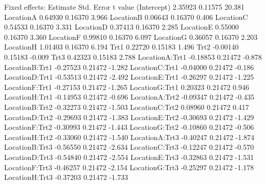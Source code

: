 \documentclass[12pt]{article}
\begin{document}
\begin{Schunk}
\begin{Soutput}
Fixed effects:
               Estimate Std. Error t value
(Intercept)     2.35923    0.11575  20.381
LocationA       0.64930    0.16370   3.966
LocationB       0.06643    0.16370   0.406
LocationC       0.54533    0.16370   3.331
LocationD       0.37413    0.16370   2.285
LocationE       0.55000    0.16370   3.360
LocationF       0.99810    0.16370   6.097
LocationG       0.36057    0.16370   2.203
LocationH       1.01403    0.16370   6.194
Trt1            0.22720    0.15183   1.496
Trt2           -0.00140    0.15183  -0.009
Trt3            0.42323    0.15183   2.788
LocationA:Trt1 -0.18853    0.21472  -0.878
LocationB:Trt1 -0.27523    0.21472  -1.282
LocationC:Trt1 -0.04000    0.21472  -0.186
LocationD:Trt1 -0.53513    0.21472  -2.492
LocationE:Trt1 -0.26297    0.21472  -1.225
LocationF:Trt1 -0.27153    0.21472  -1.265
LocationG:Trt1  0.20323    0.21472   0.946
LocationH:Trt1 -0.14953    0.21472  -0.696
LocationA:Trt2 -0.09347    0.21472  -0.435
LocationB:Trt2 -0.32273    0.21472  -1.503
LocationC:Trt2  0.08960    0.21472   0.417
LocationD:Trt2 -0.29693    0.21472  -1.383
LocationE:Trt2 -0.30693    0.21472  -1.429
LocationF:Trt2 -0.30993    0.21472  -1.443
LocationG:Trt2 -0.10860    0.21472  -0.506
LocationH:Trt2 -0.33060    0.21472  -1.540
LocationA:Trt3 -0.40247    0.21472  -1.874
LocationB:Trt3 -0.56550    0.21472  -2.634
LocationC:Trt3 -0.12247    0.21472  -0.570
LocationD:Trt3 -0.54840    0.21472  -2.554
LocationE:Trt3 -0.32863    0.21472  -1.531
LocationF:Trt3 -0.46257    0.21472  -2.154
LocationG:Trt3 -0.25297    0.21472  -1.178
LocationH:Trt3 -0.37203    0.21472  -1.733


\end{Soutput}
\end{Schunk}
\end{document}
